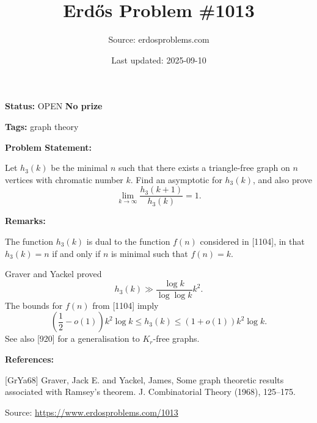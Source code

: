 \documentclass{article}
\title{Erd\H{o}s Problem \#1013}
\date{Last updated: 2025-09-10}
\author{Source: erdosproblems.com}
\begin{document}
\maketitle

\noindent\textbf{Status:} OPEN \quad \textbf{No prize}

\noindent\textbf{Tags:} graph theory

\medskip
\noindent\textbf{Problem Statement:}

Let $h_3(k)$ be the minimal $n$ such that there exists a triangle-free graph on $n$ vertices with chromatic number $k$. Find an asymptotic for $h_3(k)$, and also prove\[\lim_{k\to \infty}\frac{h_3(k+1)}{h_3(k)}=1.\]

\bigskip
\noindent\textbf{Remarks:}

The function $h_3(k)$ is dual to the function $f(n)$ considered in [1104], in that $h_3(k)= n$ if and only if $n$ is minimal such that $f(n)=k$.

Graver and Yackel \cite{GrYa68} proved\[h_3(k)\gg \frac{\log k}{\log\log k}k^2.\]The bounds for $f(n)$ from [1104] imply\[\left(\frac{1}{2}-o(1)\right)k^2\log k\leq h_3(k) \leq (1+o(1))k^2\log k.\]See also [920] for a generalisation to $K_r$-free graphs.

\bigskip
\noindent\textbf{References:}

[GrYa68] Graver, Jack E. and Yackel, James, Some graph theoretic results associated with Ramsey's theorem. J. Combinatorial Theory (1968), 125--175.

\bigskip
\noindent\small{Source: \url{https://www.erdosproblems.com/1013}}
\end{document}
